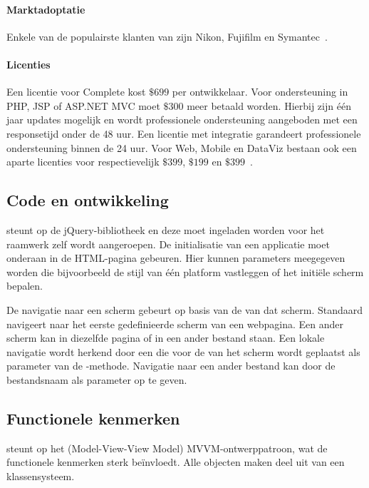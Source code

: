 \paragraph{Marktadoptatie}
Enkele van de populairste klanten van \kendo{} zijn Nikon,  Fujifilm en Symantec~\cite{Telerike}.

\paragraph{Licenties}
Een licentie voor \kendo{} Complete kost $\$699$ per ontwikkelaar.
Voor  ondersteuning in PHP,  JSP of ASP.NET MVC moet $\$300$ meer betaald worden.
Hierbij zijn één jaar updates mogelijk en wordt professionele ondersteuning aangeboden met een responsetijd onder de 48 uur.
Een licentie met  integratie garandeert professionele ondersteuning binnen de 24 uur.
Voor \kendo{} Web,  Mobile en DataViz bestaan ook een aparte licenties voor respectievelijk $\$399$,  $\$199$ en $\$399$~\cite{Telerike}.

\subsection{Code en ontwikkeling}
\kendo{} steunt op de jQuery-bibliotheek en deze moet ingeladen worden voor het \kendo{} raamwerk zelf wordt aangeroepen.
De initialisatie van een applicatie moet onderaan in de HTML-pagina gebeuren.	
Hier kunnen parameters meegegeven worden die bijvoorbeeld de stijl van één platform vastleggen of het initiële scherm bepalen.

De navigatie naar een scherm gebeurt op basis van de  van dat scherm.
Standaard navigeert \kendo{} naar het eerste gedefinieerde scherm van een webpagina.
Een ander scherm kan in diezelfde pagina of in een ander bestand staan.
Een lokale navigatie wordt herkend door een  die voor de  van het scherm wordt geplaatst als parameter van de -methode.
Navigatie naar een ander bestand kan door de bestandsnaam als parameter op te geven.

\subsection{Functionele kenmerken}
\label{sec:kendo-functioneel}
\kendo{} steunt op het (Model-View-View Model) MVVM-ontwerppatroon,  wat de functionele kenmerken sterk beïnvloedt.
Alle objecten maken deel uit van een klassensysteem.

